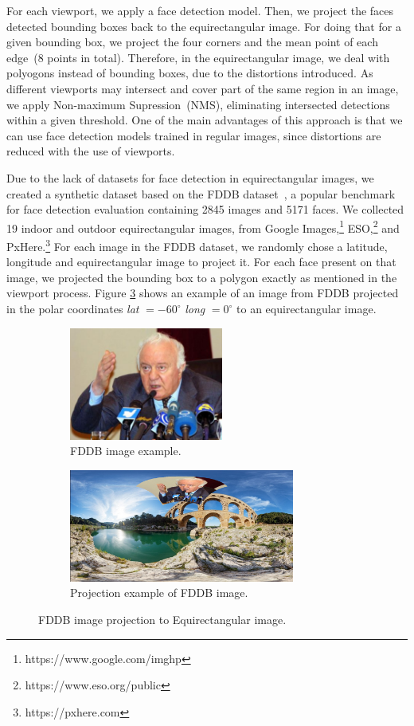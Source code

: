 For each viewport, we apply a face detection model. 
Then, we project the faces detected bounding boxes back to the equirectangular image. For doing that for a given bounding box, we project the four corners and the mean point of each edge~(8 points in total). Therefore, in the equirectangular image, we deal with polyogons instead of bounding boxes, due to the distortions introduced. As different viewports may intersect and cover part of the same region in an image, we apply Non-maximum Supression~(NMS), eliminating intersected detections within a given threshold. One of the main advantages of this approach is that we can use face detection models trained in regular images, since distortions are reduced with the use of viewports.

Due to the lack of datasets for face detection in equirectangular images, we created a synthetic dataset based on the FDDB dataset~\cite{fddbTech}, a popular benchmark for face detection evaluation containing 2845 images and 5171 faces. We collected 19 indoor and outdoor equirectangular images, from Google Images,\footnote{https://www.google.com/imghp} ESO,\footnote{https://www.eso.org/public} and PxHere.\footnote{https://pxhere.com}
For each image in the FDDB dataset, we randomly chose a latitude, longitude and equirectangular image to project it. For each face present on that image, we projected the bounding box to a polygon exactly as mentioned in the viewport process. Figure \ref{fig:fddb_proj} shows an example of an image from FDDB projected in the polar coordinates \emph{lat} $ = -60^{\circ}$ \emph{long} $= 0^{\circ}$ to an equirectangular image.

\begin{figure}[!ht]
\centering
    \begin{subfigure}{0.4\linewidth}
        \centering
        \includegraphics[height=10em]{img/face_pre.png}
        \caption{FDDB image example.}
        \label{subfig:face_pre}
    \end{subfigure}\hfill
    \begin{subfigure}{0.55\linewidth}
        \centering
        \includegraphics[height=10em]{img/face_pos.png}
        \caption{Projection example of FDDB image.}
        \label{subfig:face_pos}
    \end{subfigure}

\caption{FDDB image projection to Equirectangular image.}
\label{fig:fddb_proj}
\end{figure}

